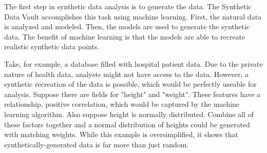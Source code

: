 The first step in synthetic data analysis is to generate the data. The Synthetic Data Vault accomplishes this task using machine learning. First, the natural data is analyzed and modeled. Then, the models are used to generate the synthetic data. The benefit of machine learning is that the models are able to recreate realistic synthetic data points.

Take, for example, a database filled with hospital patient data. Due to the private nature of health data, analysts might not have access to the data. However, a synthetic recreation of the data is possible, which would be perfectly useable for analysis. Suppose there are fields for "height" and "weight". These features have a relationship, positive correlation, which would be captured by the machine learning algorithm. Also suppose height is normally distributed. Combine all of these factors together and a normal distribution of heights could be generated with matching weights. While this example is oversimplified, it shows that synthetically-generated data is far more than just random.


 

